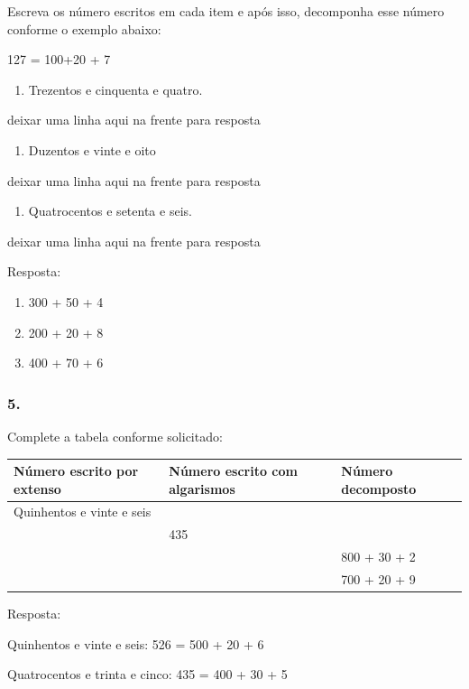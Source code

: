 Escreva os número escritos em cada item e após isso, decomponha esse
número conforme o exemplo abaixo:

127 = 100+20 + 7

\begin{enumerate}
\def\labelenumi{\alph{enumi})}
\item
  Trezentos e cinquenta e quatro.
\end{enumerate}

deixar uma linha aqui na frente para resposta

\begin{enumerate}
\def\labelenumi{\alph{enumi})}
\item
  Duzentos e vinte e oito
\end{enumerate}

deixar uma linha aqui na frente para resposta

\begin{enumerate}
\def\labelenumi{\alph{enumi})}
\item
  Quatrocentos e setenta e seis.
\end{enumerate}

deixar uma linha aqui na frente para resposta

Resposta:

\begin{enumerate}
\def\labelenumi{\alph{enumi})}
\item
  300 + 50 + 4
\item
  200 + 20 + 8
\item
  400 + 70 + 6
\end{enumerate}

\subsubsection{5. }\label{section-4}

Complete a tabela conforme solicitado:

\begin{longtable}[]{@{}lll@{}}
\toprule
Número escrito por extenso & Número escrito com algarismos & Número
decomposto\tabularnewline
\midrule
\endhead
Quinhentos e vinte e seis & &\tabularnewline
& 435 &\tabularnewline
& & 800 + 30 + 2\tabularnewline
& & 700 + 20 + 9\tabularnewline
\bottomrule
\end{longtable}

Resposta:

Quinhentos e vinte e seis: 526 = 500 + 20 + 6

Quatrocentos e trinta e cinco: 435 = 400 + 30 + 5

